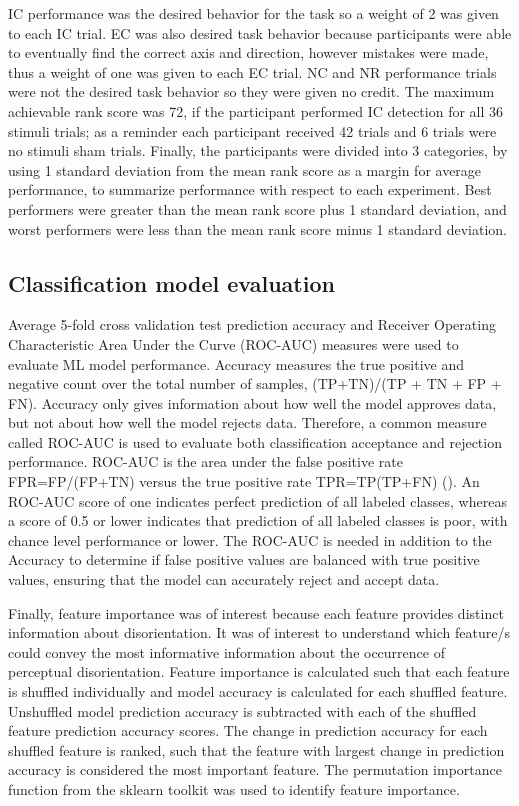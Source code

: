 \documentclass[11pt, onecolumn]{article}
\begin{document}
IC performance was the desired behavior for the task so a weight of 2 was given to each IC trial.  EC was also desired task behavior because participants were able to eventually find the correct axis and direction, however mistakes were made, thus a weight of one was given to each EC trial.  NC and NR performance trials were not the desired task behavior so they were given no credit.  The maximum achievable rank score was 72, if the participant performed IC detection for all 36 stimuli trials; as a reminder each participant received 42 trials and 6 trials were no stimuli sham trials.  Finally, the participants were divided into 3 categories, by using 1 standard deviation from the mean rank score as a margin for average performance, to summarize performance with respect to each experiment. Best performers were greater than the mean rank score plus 1 standard deviation, and worst performers were less than the mean rank score minus 1 standard deviation.

\subsection{Classification model evaluation}
Average 5-fold cross validation test prediction accuracy and Receiver Operating Characteristic Area Under the Curve (ROC-AUC) measures were used to evaluate ML model performance.  Accuracy measures the true positive and negative count over the total number of samples, (TP+TN)/(TP + TN + FP + FN).  Accuracy only gives information about how well the model approves data, but not about how well the model rejects data.  Therefore, a common measure called ROC-AUC is used to evaluate both classification acceptance and rejection performance.  ROC-AUC is the area under the false positive rate FPR=FP/(FP+TN) versus the true positive rate TPR=TP(TP+FN) (\cite{Burkov_2019_ML}).  An ROC-AUC score of one indicates perfect prediction of all labeled classes, whereas a score of 0.5 or lower indicates that prediction of all labeled classes is poor, with chance level performance or lower.  The ROC-AUC is needed in addition to the Accuracy to determine if false positive values are balanced with true positive values, ensuring that the model can accurately reject and accept data.

Finally, feature importance was of interest because each feature provides distinct information about disorientation.  It was of interest to understand which feature/s could convey the most informative information about the occurrence of perceptual disorientation.  Feature importance is calculated such that each feature is shuffled individually and model accuracy is calculated for each shuffled feature.  Unshuffled model prediction accuracy is subtracted with each of the shuffled feature prediction accuracy scores. The change in prediction accuracy for each shuffled feature is ranked, such that the feature with largest change in prediction accuracy is considered the most important feature.  The permutation importance function from the sklearn toolkit was used to identify feature importance.
\end{document}
